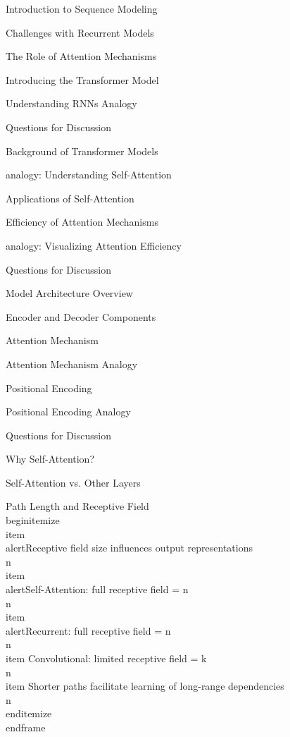 \documentclass{beamer}
\begin{document}
\begin{frame}[]{Introduction to Sequence Modeling}
\begin{frame}[]{Challenges with Recurrent Models}
\begin{frame}[]{The Role of Attention Mechanisms}
\begin{frame}[]{Introducing the Transformer Model}
\begin{frame}[plain]{Understanding RNNs Analogy}
\begin{frame}[]{Questions for Discussion}
\begin{frame}[]{Background of Transformer Models}
\begin{frame}[plain]{analogy: Understanding Self-Attention}
\begin{frame}[]{Applications of Self-Attention}
\begin{frame}[]{Efficiency of Attention Mechanisms}
\begin{frame}[plain]{analogy: Visualizing Attention Efficiency}
\begin{frame}[]{Questions for Discussion}
\begin{frame}[]{Model Architecture Overview}
\begin{frame}[]{Encoder and Decoder Components}
\begin{frame}[]{Attention Mechanism}
\begin{frame}[plain]{Attention Mechanism Analogy}
\begin{frame}[]{Positional Encoding}
\begin{frame}[plain]{Positional Encoding Analogy}
\begin{frame}[]{Questions for Discussion}
\begin{frame}[]{Why Self-Attention?}
\begin{frame}[]{Self-Attention vs. Other Layers}
\begingroup
{}\n{}\n\begin{frame}[]{Path Length and Receptive Field}\n\\begin{itemize}
\\item \\alert{Receptive field size influences output representations}\\n\\item \\alert{Self-Attention: full receptive field = n}\\n\\item \\alert{Recurrent: full receptive field = n}\\n\\item Convolutional: limited receptive field = k\\n\\item Shorter paths facilitate learning of long-range dependencies\\n\\end{itemize}
\\end{frame}

\endgroup


\end{frame}
\end{frame}
\end{frame}
\end{frame}
\end{frame}
\end{frame}
\end{frame}
\end{frame}
\end{frame}
\end{frame}
\end{frame}
\end{frame}
\end{frame}
\end{frame}
\end{frame}
\end{frame}
\end{frame}
\end{frame}
\end{frame}
\end{frame}
\end{frame}
\end{frame}
\end{document}
